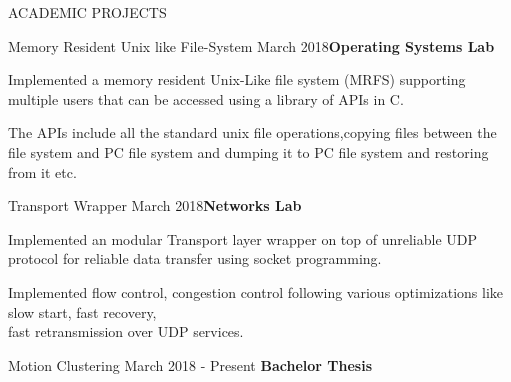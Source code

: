 \documentclass{resume} %
\begin{document}
  


\begin{rSection}{ACADEMIC PROJECTS}




\begin{rSubsection}{Memory Resident Unix like File-System } {March 2018}{\textbf{Operating Systems Lab}}{}

\item Implemented a memory resident Unix-Like file system (MRFS) supporting multiple users that can be accessed using a library of APIs in C.
\item The APIs include all the standard unix file operations,copying files between the file system and PC file system and dumping it to PC file system and restoring from it etc.
\end{rSubsection}  

\begin{rSubsection}{Transport Wrapper} {March 2018}{\textbf{Networks Lab}}{}

\item Implemented an modular Transport layer wrapper on top of unreliable UDP protocol for reliable data
transfer using socket programming.
\item Implemented flow control, congestion control following various optimizations like slow start, fast recovery,\\fast retransmission over UDP services.
\end{rSubsection}  


\begin{rSubsection}{Motion Clustering} {March 2018 - Present }{\textbf{Bachelor Thesis}}{}


\end{rSubsection}
\end{rSection}
\end{document}
